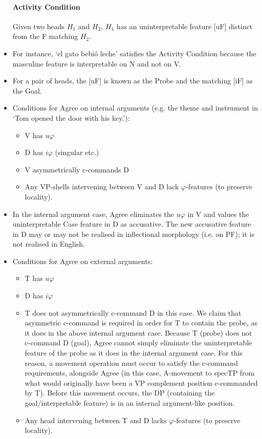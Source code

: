 \documentclass{article}
\begin{document}
\begin{itemize}
    \paragraph{Activity Condition} Given two heads $H_1$ and $H_2$, $H_1$ has an uninterpretable feature [uF] distinct from the F matching $H_2$.
    \item For instance, `el gato bebió leche' satisfies the Activity Condition because the masculine feature is interpretable on N and not on V.
    \item For a pair of heads, the [uF] is known as the Probe and the matching [iF] as the Goal.
    \item Conditions for Agree on internal arguments (e.g. the theme and instrument in `Tom opened the door with his key.'):
    \begin{itemize}
        \item V has $u\varphi$
        \item D has $i\varphi$ (singular etc.)
        \item V asymmetrically c-commands D
        \item Any VP-shells intervening between V and D lack $\varphi$-features (to preserve locality).
    \end{itemize} 
    \item In the internal argument case, Agree eliminates the $u\varphi$ in V and values the uninterpretable Case feature in D as accusative. The new accusative feature in D may or may not be realised in inflectional morphology (i.e. on PF); it is not realised in English.
    \item Conditions for Agree on external arguments:
    \begin{itemize}
        \item T has $u\varphi$
        \item D has $i\varphi$
        \item T does not asymmetrically c-command D in this case. We claim that asymmetric c-command is required in order for T to contain the probe, as it does in the above internal argument case. Because T (probe) does not c-command D (goal), Agree cannot simply eliminate the uninterpretable feature of the probe as it does in the internal argument case. For this reason, a movement operation must occur to satisfy the c-command requirements, alongside Agree (in this case, A-movement to specTP from what would originally have been a VP complement position c-commanded by T). Before this movement occurs, the DP (containing the goal/interpretable feature) is in an internal argument-like position.
        \item Any head intervening between T and D lacks $\varphi$-features (to preserve locality).
    \end{itemize}

\end{itemize}
\end{document}
